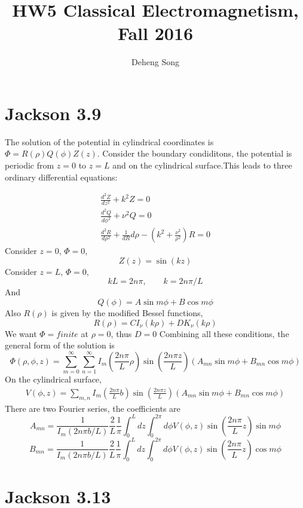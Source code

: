 \documentclass{article}
\begin{document}
\title{HW5 Classical Electromagnetism, Fall 2016}
\author{Deheng Song}
\maketitle
\section*{Jackson 3.9}

The solution of the potential in cylindrical coordinates is $\Phi=R(\rho)Q(\phi)Z(z)$. Consider the boundary condiditons, the potential is periodic from $z=0$ to $z=L$ and on the cylindrical surface.This leads to three ordinary differential equations:

\begin{align*}
  \frac{d^2Z}{dz^2}+k^2Z=0\\
  \frac{d^2Q}{d\phi^2}+\nu^2 Q=0\\
  \frac{d^2 R}{d\rho^2}+\frac{1}{dR}{d\rho}-(k^2+\frac{\nu^2}{\rho^2})R=0
\end{align*}
Consider $z=0$, $\Phi=0$,
\[ Z(z)=\sin(kz) \]
Consider $z=L$, $\Phi=0$,
\[ kL=2n\pi,\qquad k=2n\pi/L \]
And
\[ Q(\phi)=A\sin m\phi+ B\cos m\phi \]
Also $R(\rho)$ is given by the modified Bessel functions,
\[ R(\rho)=CI_\nu(k\rho)+DK_\nu(k\rho)\]
We want $\Phi=finite$ at $\rho=0$, thus $D=0$
Combining all these conditions, the general form of the solution is
\[ \Phi(\rho,\phi,z)=\sum^{\infty}_{m=0}\sum^{\infty}_{n=1}I_m(\frac{2n\pi}{L}\rho)\sin(\frac{2n\pi z}{L})(A_{mn}\sin m\phi+B_{mn}\cos m\phi) \]
On the cylindrical surface,
\begin{align*}
  V(\phi,z)=\sum_{m,n}I_m(\frac{2n\pi}{L}b)\sin(\frac{2n\pi z}{L})(A_{mn}\sin m\phi+B_{mn}\cos m\phi)
\end{align*}
There are two Fourier series, the coefficients are
\[ A_{mn}=\frac{1}{I_m(2n\pi b/L)}\frac{2}{L}\frac{1}{\pi}\int_0^L dz \int_0^{2\pi} d\phi V(\phi,z)\sin(\frac{2n\pi}{L}z)\sin m\phi \]
\[ B_{mn}=\frac{1}{I_m(2n\pi b/L)}\frac{2}{L}\frac{1}{\pi}\int_0^L dz \int_0^{2\pi} d\phi V(\phi,z)\sin(\frac{2n\pi}{L}z)\cos m\phi \]
\pagebreak

\section*{Jackson 3.13}
\end{document}
